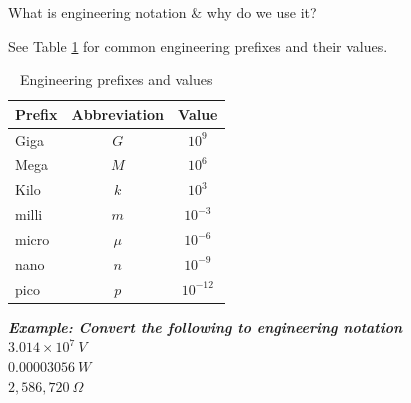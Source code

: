 \documentclass{handout}
\begin{document}
What is engineering notation \& why do we use it?

See Table \ref{tab: Eng Prefixes} for common engineering prefixes and their values.

\begin{table}[h]
\centering
\begin{tabular}{|l|c|c|}
\hline
Prefix & Abbreviation & Value \\
\hline \hline
Giga & $G$ & $10^9$ \\
Mega & $M$ & $10^6$ \\
Kilo & $k$ & $10^3$ \\
\hline
milli & $m$ & $10^{-3}$ \\
micro & $\mu$ & $10^{-6}$ \\
nano & $n$ & $10^{-9}$ \\
pico & $p$ & $10^{-12}$ \\
\hline
\end{tabular}
\caption{Engineering prefixes and values}
\label{tab: Eng Prefixes}
\end{table}


\em {\large{\textbf{Example: Convert the following to engineering notation}}} \em
\vspace{10pt}
\\
\vspace{10pt}
$3.014 \times 10^7 \ V$ \\
\vspace{10pt}
$0.00003056\ W$ \\
\vspace{10pt}
$2,586,720\ \Omega$

\begin{center}
\end{center}
\end{document}
